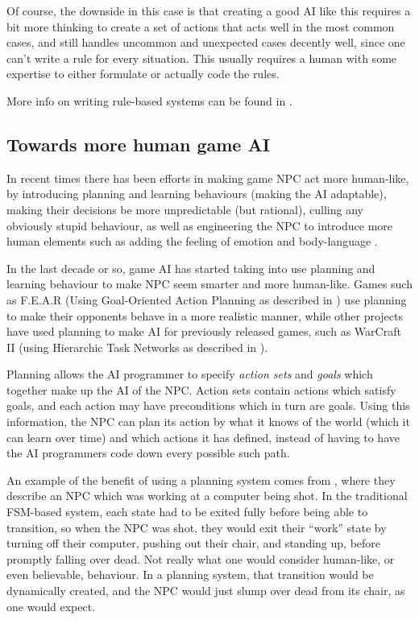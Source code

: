 \documentclass[]{report}
\begin{document}
Of course, the downside in this case is that creating a good AI like this
requires a bit more thinking to create a set of actions that acts well in the
most common cases, and still handles uncommon and unexpected cases decently
well, since one can't write a rule for every situation. This usually requires a
human with some expertise to either formulate or actually code the rules.

More info on writing rule-based systems can be found in
\citet[chap.~4]{kirby2011introduction}.

\subsection{Towards more human game AI}
\label{sec:towards-more-human}

In recent times there has been efforts in making game NPC act more human-like,
by introducing planning and learning behaviours (making the AI adaptable),
making their decisions be more unpredictable (but rational), culling any
obviously stupid behaviour, as well as engineering the NPC to introduce more
human elements such as adding the feeling of emotion and body-language
\citep{spronck2005adaptive}.

In the last decade or so, game AI has started taking into use planning and
learning behaviour to make NPC seem smarter and more human-like. Games such as
F.E.A.R (Using Goal-Oriented Action Planning as described in
\citet{orkin2006three}) use planning to make their opponents behave in a more
realistic manner, while other projects have used planning to make AI for
previously released games, such as WarCraft II (using Hierarchic Task Networks
as described in \citet{brickmanhtn}).

Planning allows the AI programmer to specify \emph{action sets} and \emph{goals}
which together make up the AI of the NPC. Action sets contain actions which
satisfy goals, and each action may have preconditions which in turn are
goals. Using this information, the NPC can plan its action by what it knows of
the world (which it can learn over time) and which actions it has defined,
instead of having to have the AI programmers code down every possible such path.

An example of the benefit of using a planning system comes from
\citet{orkin2006three}, where they describe an NPC which was working at a
computer being shot. In the traditional FSM-based system, each state had to be
exited fully before being able to transition, so when the NPC was shot, they
would exit their ``work'' state by turning off their computer, pushing out their
chair, and standing up, before promptly falling over dead. Not really what one
would consider human-like, or even believable, behaviour. In a planning system,
that transition would be dynamically created, and the NPC would just slump over
dead from its chair, as one would expect.
\end{document}
